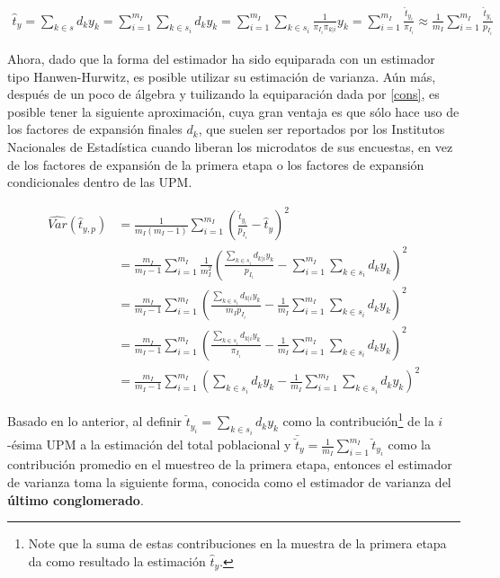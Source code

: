 \documentclass[12pt,spanish,]{book}
\let\rmarkdownfootnote\footnote%
\def\footnote{\protect\rmarkdownfootnote}
\begin{document}
\begin{align*}
\hat{t}_{y} =\sum_{k\in s} d_k y_k  
= \sum_{i=1}^{m_I}\sum_{k \in s_i} d_k y_k 
= \sum_{i=1}^{m_I}\sum_{k \in s_i} \frac{1}{\pi_{I_i} \pi_{k|i}} y_k 
= \sum_{i=1}^{m_I}\frac{\hat{t}_{y_i}}{\pi_{I_i}} 
\approx \frac{1}{m_I}\sum_{i=1}^{m_I}\frac{\hat{t}_{y_i}}{p_{I_i}}
\end{align*}

Ahora, dado que la forma del estimador ha sido equiparada con un estimador tipo Hanwen-Hurwitz, es posible utilizar su estimación de varianza. Aún más, después de un poco de álgebra y tuilizando la equiparación dada por \eqref{cons}, es posible tener la siguiente aproximación, cuya gran ventaja es que sólo hace uso de los factores de expansión finales \(d_k\), que suelen ser reportados por los Institutos Nacionales de Estadística cuando liberan los microdatos de sus encuestas, en vez de los factores de expansión de la primera etapa o los factores de expansión condicionales dentro de las UPM.

\begin{align*}
\widehat{Var}(\hat{t}_{y,p})&=\frac{1}{m_I(m_I-1)}\sum_{i=1}^{m_I}\left(\frac{\hat{t}_{y_i}}{p_{I_i}}-\hat{t}_{y}\right)^2\\
&=\frac{m_I}{m_I-1}\sum_{i=1}^{m_I}\frac{1}{m_I^2}\left(\frac{\sum_{k \in s_i} d_{k|i} y_k }{p_{I_i}}-\sum_{i=1}^{m_I}\sum_{k \in s_i} d_k y_k \right)^2 \\
&=\frac{m_I}{m_I-1}\sum_{i=1}^{m_I}\left(\frac{\sum_{k \in s_i} d_{k|i} y_k }{m_I p_{I_i}}-\frac{1}{m_I}\sum_{i=1}^{m_I}\sum_{k \in s_i} d_k y_k \right)^2 \\
&=\frac{m_I}{m_I-1}\sum_{i=1}^{m_I}\left(\frac{\sum_{k \in s_i} d_{k|i} y_k }{\pi_{I_i}}-\frac{1}{m_I}\sum_{i=1}^{m_I}\sum_{k \in s_i} d_k y_k \right)^2 \\
&=\frac{m_I}{m_I-1}\sum_{i=1}^{m_I}\left( \sum_{k \in s_i} d_k y_k -\frac{1}{m_I}\sum_{i=1}^{m_I}\sum_{k \in s_i} d_k y_k \right)^2 
\end{align*}

Basado en lo anterior, al definir \(\breve{t}_{y_i} = \sum_{k \in s_i} d_k y_k\) como la contribución\footnote{Note que la suma de estas contribuciones en la muestra de la primera etapa da como resultado la estimación \(\hat{t}_y\).} de la \(i\)-ésima UPM a la estimación del total poblacional y \(\bar{\breve{t}}_{y}=\frac{1}{m_I}\sum_{i=1}^{m_I}\breve{t}_{y_i}\) como la contribución promedio en el muestreo de la primera etapa, entonces el estimador de varianza toma la siguiente forma, conocida como el estimador de varianza del \textbf{último conglomerado}.
\end{document}
